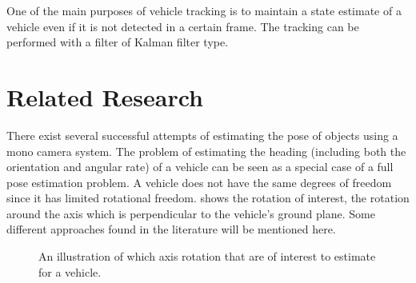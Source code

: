 One of the main purposes of vehicle tracking is to maintain a state estimate of a vehicle even if it is not detected in a certain frame.
The tracking can \eg be performed with a filter of Kalman filter \cite{Sivaraman:2013} type.

\section{Related Research}
\label{sec:relatedresearch}
There exist several successful attempts of estimating the  pose of objects using a mono camera system.
The problem of estimating the heading (including both the orientation and angular rate) of a vehicle can be seen as a special case of a full  pose estimation problem.
A vehicle does not have the same degrees of freedom since it has limited rotational freedom.
 shows the rotation of interest, \ie the rotation around the axis which is perpendicular to the vehicle's ground plane.
Some different approaches found in the literature will be mentioned here.

\begin{figure}[!ht]
	\centering
	\caption{\label{fig:vehiclerotation} An illustration of which axis rotation that are of interest to estimate for a vehicle.}
\end{figure}

